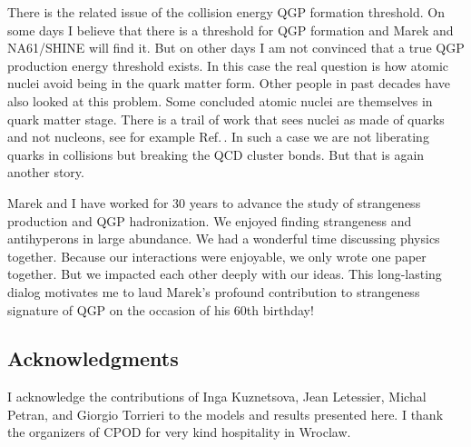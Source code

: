 \documentclass{appolb}
\begin{document}
There is the related issue of the collision energy QGP formation threshold. On some days I believe that there is a threshold for QGP formation and Marek and NA61/SHINE will find it. But on other days I am not convinced that a true QGP production energy threshold exists. In this case the real question is how atomic nuclei avoid being in the quark matter form. Other people in past decades have also looked at this problem. Some concluded atomic nuclei are themselves in quark matter stage. There is a trail of work that sees nuclei as made of quarks and not nucleons, see for example Ref.\,\cite{Watson:1988up}. In such a case we are not liberating quarks in collisions but breaking the  QCD cluster bonds.  But that is again another story.

Marek and I have worked for 30 years to advance the study of strangeness production and QGP hadronization. We enjoyed finding  strangeness and antihyperons in large abundance.  We had a wonderful time discussing physics together. Because our interactions were enjoyable, we only wrote one paper together. But we impacted each other deeply with our ideas. This long-lasting dialog motivates me to laud Marek\rq s profound contribution to strangeness signature of QGP on the occasion of his 60th birthday!

\subsection*{Acknowledgments}
I acknowledge the contributions of Inga Kuznetsova, Jean Letessier, Michal Petran, and Giorgio Torrieri to the models and results presented here. I thank the organizers of CPOD for  very kind hospitality in Wroclaw. 
\end{document}
